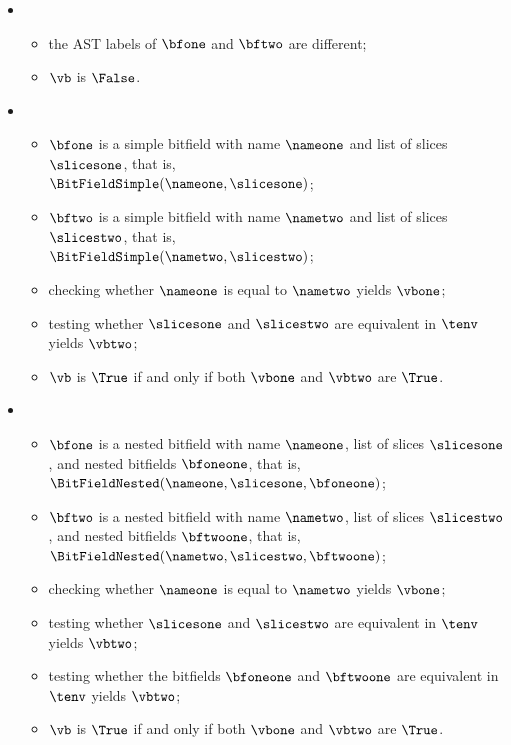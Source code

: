 \ProseParagraph
\OneApplies
\begin{itemize}
  \item {}
  \begin{itemize}
    \item the AST labels of $\bfone$ and $\bftwo$ are different;
    \item $\vb$ is $\False$.
  \end{itemize}

  \item {}
  \begin{itemize}
    \item $\bfone$ is a simple bitfield with name $\nameone$ and list of slices $\slicesone$, that is, \\ $\BitFieldSimple(\nameone, \slicesone)$;
    \item $\bftwo$ is a simple bitfield with name $\nametwo$ and list of slices $\slicestwo$, that is, \\ $\BitFieldSimple(\nametwo, \slicestwo)$;
    \item checking whether $\nameone$ is equal to $\nametwo$ yields $\vbone$;
    \item testing whether $\slicesone$ and $\slicestwo$ are equivalent in $\tenv$ yields $\vbtwo$\ProseOrTypeError;
    \item $\vb$ is $\True$ if and only if both $\vbone$ and $\vbtwo$ are $\True$.
  \end{itemize}

  \item {}
  \begin{itemize}
    \item $\bfone$ is a nested bitfield with name $\nameone$, list of slices $\slicesone$, and nested bitfields $\bfoneone$, that is,
          $\BitFieldNested(\nameone, \slicesone, \bfoneone)$;
    \item $\bftwo$ is a nested bitfield with name $\nametwo$, list of slices $\slicestwo$, and nested bitfields $\bftwoone$, that is,
          $\BitFieldNested(\nametwo, \slicestwo, \bftwoone)$;
    \item checking whether $\nameone$ is equal to $\nametwo$ yields $\vbone$;
    \item testing whether $\slicesone$ and $\slicestwo$ are equivalent in $\tenv$ yields $\vbtwo$\ProseOrTypeError;
    \item testing whether the bitfields $\bfoneone$ and $\bftwoone$ are equivalent in $\tenv$ yields $\vbtwo$\ProseOrTypeError;
    \item $\vb$ is $\True$ if and only if both $\vbone$ and $\vbtwo$ are $\True$.
  \end{itemize}


\end{itemize}

